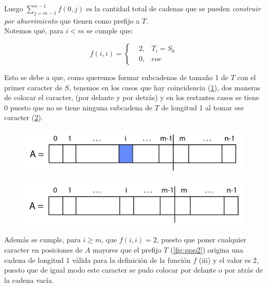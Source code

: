 \documentclass[a4paper]{article}
\begin{document}
    Luego $\sum_{j= m-1}^{n-1}f(0,j)$ es la cantidad total de cadenas que se pueden \textit{construir por aburrimiento} que tienen como prefijo a $T$.\\
    
    Notemos qu\'e, para $i < m$ se cumple que: %

    \begin{equation}\label{eq:1}
        f(i,i) = \left\{ \begin{aligned}
            &2, &T_i = S_0\\
            &0, &eoc
        \end{aligned} \right.
    \end{equation}

    Esto se debe a que, como queremos formar subcadenas de tama\~no 1 de $T$ con el primer caracter de $S$, tenemos en los casos que hay coincidencia (\ref{fig:ppp1}), dos maneras de colocar el caracter, (por delante y por detr\'as) y en los restantes casos 
    se tiene 0 puesto que no se tiene ninguna subcadena de $T$ de longitud 1 al tomar ese caracter (\ref{fig:ppp0}).\\
        
    \begin{figure}[!h]
    	\label{fig:ppp1}
    	\centering
    	\includegraphics[width=0.7\linewidth]{ppp1}
    	\caption{}
    \end{figure}

	\begin{figure}[!h]
		\label{fig:ppp0}
		\centering
		\includegraphics[width=0.7\linewidth]{ppp0}
		\caption{}
	\end{figure}

    
    
    Adem\'as se cumple, para $i \geq m$, que $f(i,i) = 2$, puesto que poner cualquier caracter en posiciones de $A$ mayores que el prefijo $T$ (\ref{fig:ppp2}) origina una cadena de longitud 1 válida para la definición de la función $f$ (iii) y el valor es 2, puesto que de igual modo este caracter se pudo colocar por delante o por atrás de la cadena vacía.\\
    
\end{document}
